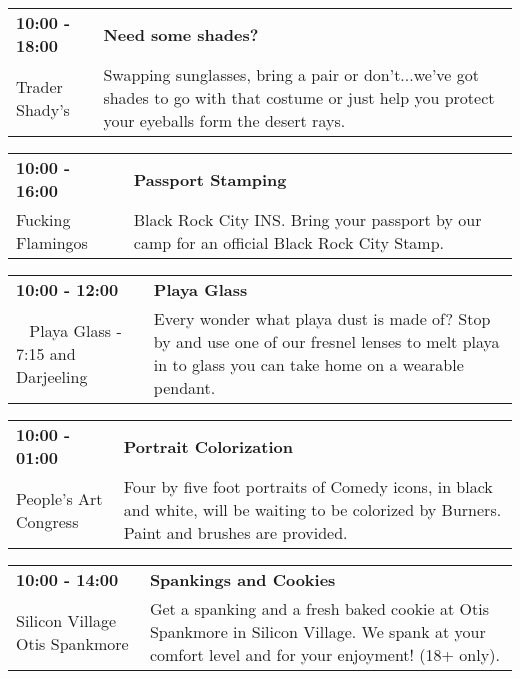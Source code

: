 \begin{tabular}{ p{1in} p{2.2in} }
    \textbf{10:00 - 18:00} & \textbf{Need some shades?} \\
    Trader Shady's \newline  & Swapping sunglasses, bring a pair or don't...we've got shades to go with that costume or just help you protect your eyeballs form the desert rays. \\
    \hline 
\end{tabular}
    
\begin{tabular}{ p{1in} p{2.2in} }
    \textbf{10:00 - 16:00} & \textbf{Passport Stamping} \\
    Fucking Flamingos \newline  & Black Rock City INS. Bring your passport by our camp for an official Black Rock City Stamp. \\
    \hline 
\end{tabular}
    
\begin{tabular}{ p{1in} p{2.2in} }
    \textbf{10:00 - 12:00} & \textbf{Playa Glass} \\
    ~ \newline Playa Glass - 7:15 and Darjeeling & Every wonder what playa dust is made of?  Stop by and use one of our fresnel lenses to melt playa in to glass you can take home on a wearable pendant. \\
    \hline 
\end{tabular}
    
\begin{tabular}{ p{1in} p{2.2in} }
    \textbf{10:00 - 01:00} & \textbf{Portrait Colorization} \\
    People's Art Congress \newline  & Four by five foot portraits of Comedy icons, in black and white, will be waiting to be colorized by Burners. Paint and brushes are provided. \\
    \hline 
\end{tabular}
    
\begin{tabular}{ p{1in} p{2.2in} }
    \textbf{10:00 - 14:00} & \textbf{Spankings and Cookies} \\
    Silicon Village \newline Otis Spankmore & Get a spanking and a fresh baked cookie at Otis Spankmore in Silicon Village. We spank at your comfort level and for your enjoyment! (18+ only). \\
    \hline 
\end{tabular}
    

